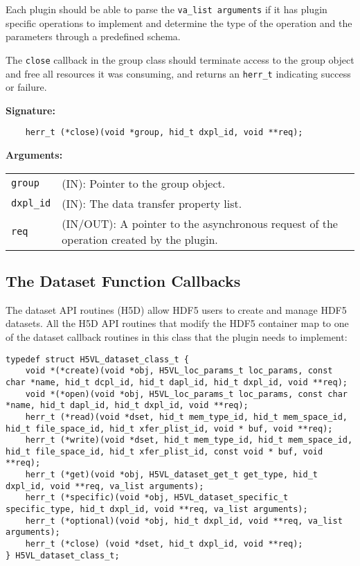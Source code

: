 Each plugin should be able to parse the {\tt va\_list arguments} if it has plugin specific operations to implement and determine the type of the operation and the parameters through a predefined schema. 

The {\tt close} callback in the group class should terminate access to
the group object and free all resources it was consuming, and returns
an {\tt herr\_t} indicating success or failure.

\textbf{Signature:}
\begin{lstlisting}
    herr_t (*close)(void *group, hid_t dxpl_id, void **req);
\end{lstlisting}

\textbf{Arguments:}\\
\begin{tabular}{l p{10cm}}
  {\tt group} & (IN): Pointer to the group object.\\
  {\tt dxpl\_id} & (IN): The data transfer property list.\\
  {\tt req} & (IN/OUT): A pointer to the asynchronous request of the
  operation created by the plugin.\\
\end{tabular}

\subsection{The Dataset Function Callbacks}
The dataset API routines (H5D) allow HDF5 users to create and manage
HDF5 datasets. All the H5D API routines that modify the HDF5 container
map to one of the dataset callback routines in this class that the
plugin needs to implement:

\begin{lstlisting}
typedef struct H5VL_dataset_class_t {
    void *(*create)(void *obj, H5VL_loc_params_t loc_params, const char *name, hid_t dcpl_id, hid_t dapl_id, hid_t dxpl_id, void **req);
    void *(*open)(void *obj, H5VL_loc_params_t loc_params, const char *name, hid_t dapl_id, hid_t dxpl_id, void **req);
    herr_t (*read)(void *dset, hid_t mem_type_id, hid_t mem_space_id, hid_t file_space_id, hid_t xfer_plist_id, void * buf, void **req);
    herr_t (*write)(void *dset, hid_t mem_type_id, hid_t mem_space_id, hid_t file_space_id, hid_t xfer_plist_id, const void * buf, void **req);
    herr_t (*get)(void *obj, H5VL_dataset_get_t get_type, hid_t dxpl_id, void **req, va_list arguments);
    herr_t (*specific)(void *obj, H5VL_dataset_specific_t specific_type, hid_t dxpl_id, void **req, va_list arguments);
    herr_t (*optional)(void *obj, hid_t dxpl_id, void **req, va_list arguments);
    herr_t (*close) (void *dset, hid_t dxpl_id, void **req);
} H5VL_dataset_class_t;
\end{lstlisting}

